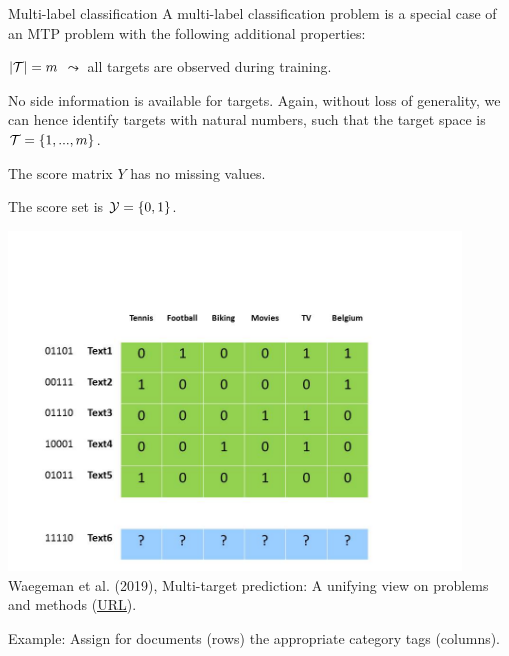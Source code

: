 \begin{frame}{Multi-label classification}
	\small
%	 
		A multi-label classification problem is a special case of an MTP problem with the following additional properties: 
		\begin{enumerate} \small
			\item[P5] $|\mathcal{T}|=m$ $\leadsto$ all targets are observed during training. 
%			
			\item[P6] No side information is available for targets. Again, without loss of generality, we can hence identify targets with natural numbers, such that the target space is $\mathcal{T} = \{1,...,m\}$. 
%			

		\begin{minipage}{0.45\textwidth}  
%			
			\item[P7] The score matrix $Y$ has no missing values. 
%			
			\item[P8b] The score set is $\mathcal{Y} = \{0,1\}$. 
%			
		\end{minipage}
		\begin{minipage}{0.45\textwidth}    
		\begin{center}
			\includegraphics[width=0.9\textwidth,trim = 0 0 100 100,clip]{figure/Slide2} \tiny
			\\ Waegeman et al. (2019), Multi-target prediction:
			A unifying view on problems and methods (\href{https://arxiv.org/pdf/1809.02352.pdf}{\underline{URL}}).
		\end{center}
		\end{minipage}
	\end{enumerate}	
%
	Example: Assign for documents (rows) the appropriate category tags (columns).
% 
\end{frame}


